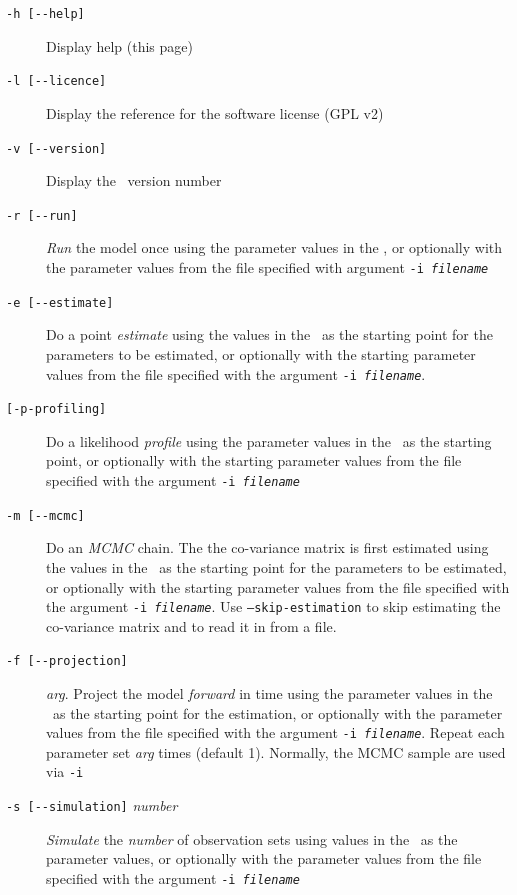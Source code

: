 \begin{description}
\item [\texttt{-h [-{}-help]}] Display help (this page)
\item [\texttt{-l [-{}-licence]}] Display the reference for the software license (GPL v2)
\item [\texttt{-v [-{}-version]}] Display the \CNAME\ version number

\item [\texttt{-r [-{}-run]}] \emph{Run} the model once using the parameter values in the \config, or optionally with the parameter values from the file specified with argument \texttt{-i \emph{filename}}

\item [\texttt{-e [-{}-estimate]}] Do a point \emph{estimate} using the values in the \config\ as the starting point for the parameters to be estimated, or optionally with the starting parameter values from the file specified with the argument \texttt{-i \emph{filename}}.

\item [\texttt{[-{p}-profiling]}] Do a likelihood \emph{profile} using the parameter values in the \config\ as the starting point, or optionally with the starting parameter values from the file specified with the argument \texttt{-i \emph{filename}}

\item [\texttt{-m [-{}-mcmc]}] Do an \emph{MCMC} chain. The the co-variance matrix is first estimated using the values in the \config\ as the starting point for the parameters to be estimated, or optionally with the starting parameter values from the file specified with the argument \texttt{-i \emph{filename}}. Use \texttt{--skip-estimation} to skip estimating the co-variance matrix and to read it in from a file.

\item [\texttt{-f [-{}-projection]}] \emph{arg}. Project the model \emph{forward} in time using the parameter values in the \config\ as the starting point for the estimation, or optionally with the parameter values from the file specified with the argument \texttt{-i \emph{filename}}. Repeat each parameter set \emph{arg} times (default 1). Normally, the MCMC sample are used via \texttt{-i}

\item [\texttt{-s [-{}-simulation]} \emph{number}] \emph{Simulate} the \emph{number} of observation sets using values in the \config\ as the parameter values, or optionally with the parameter values from the file specified with the argument \texttt{-i \emph{filename}}
\end{description}

